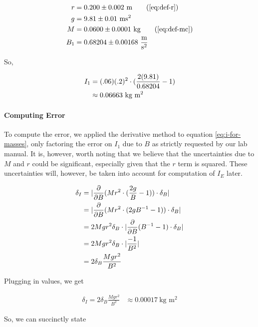 \documentclass[coverpage]{article}
\newcommand{\iUnit}{\text{kg $\text{m}^2$}}
\newcommand{\mpssq}{\frac{\text{m}}{\text{s}^2}}
\begin{document}
	\begin{align}
		r &= 0.200 \pm 0.002 \ \text{m} \tag{\ref{eq:def-r}} \\
		g &= 9.81 \pm 0.01\ \text{m} \text{s}^2 \label{eq:def-g} \\
		M &= 0.0600 \pm 0.0001\ \text{kg} \tag{\ref{eq:def-mc}} \notag \\
		B_1 &= 0.68204 \pm 0.00168\ \mpssq \label{eq:def-b1}
	\end{align}

	So,
	
	\begin{align}
		I_1 &= (.06)(.2)^2 \cdot (\frac{2(9.81)}{0.68204} - 1) \notag \\
		&\approx 0.06663\ \iUnit
	\end{align}

	\paragraph{Computing Error}
	
	To compute the error, we applied the derivative method to equation \ref{eq:i-for-masses}, only factoring the error on $I_1$ due to $B$ as strictly requested by our lab manual. It is, however, worth noting that we believe that the uncertainties due to $M$ and $r$ could be significant, especially given that the $r$ term is squared. These uncertainties will, however, be taken into account for computation of $I_E$ later.
	
	\begin{align}
		\delta_I &= |\frac{\partial}{\partial B} (Mr^2 \cdot (\frac{2g}{B} - 1)) \cdot \delta_B| \notag \\
		&= |\frac{\partial}{\partial B} (Mr^2 \cdot (2g B^{-1} - 1)) \cdot \delta_B \notag| \notag \\
		&= 2 M g r^2 \delta_B \cdot |\frac{\partial}{\partial B} (B^{-1} - 1) \cdot \delta_B \notag| \notag \\
		&= 2 M g r^2 \delta_B \cdot |\frac{-1}{B^2}| \notag \\
		&= 2 \delta_B \frac{M g r^2}{B^2} \label{eq:delta-i-formula}
	\end{align}
	
	Plugging in values, we get
	
	\begin{align}
		\delta_I = 2 \delta_B \frac{M g r^2}{B^2}
		&\approx 0.00017\ \iUnit
	\end{align}
	
	So, we can succinctly state
	
\end{document}
